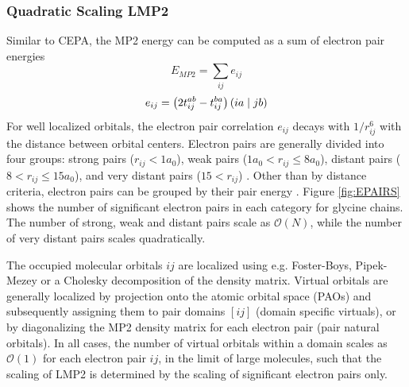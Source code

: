 \subsubsection{Quadratic Scaling LMP2}

Similar to CEPA, the MP2 energy can be computed as a sum of electron pair energies
\begin{equation}
E_{MP2} = \sum_{ij} e_{ij}
\end{equation}
\begin{equation}
e_{ij} = \left( 2t_{ij}^{ab} - t_{ij}^{ba} \right) \left( ia \mid jb \right) 
\end{equation} 
 \noindent For well localized orbitals, the electron pair correlation $e_{ij}$ decays with $1/r_{ij}^6$ with the distance between orbital centers. Electron pairs are generally divided into four groups: strong pairs ($r_{ij} < 1a_0$), weak pairs ($1a_0 < r_{ij} \leq 8 a_0$), distant pairs ($8 < r_{ij} \leq 15 a_0$), and very distant pairs ($15 < r_{ij}$) \cite{Sch1999}. Other than by distance criteria, electron pairs can be grouped by their pair energy \cite{Nee2009}. Figure \ref{fig:EPAIRS} shows the number of significant electron pairs in each category for glycine chains. The number of strong, weak and distant pairs scale as $\mathcal{O}(N)$, while the number of very distant pairs scales quadratically. 

The occupied molecular orbitals $ij$ are localized using e.g. Foster-Boys, Pipek-Mezey or a Cholesky decomposition of the density matrix. Virtual orbitals are generally localized by projection onto the atomic orbital space (PAOs) and subsequently assigning them to pair domains $[ij]$ (domain specific virtuals), or by diagonalizing the MP2 density matrix for each electron pair (pair natural orbitals).  In all cases, the number of virtual orbitals within a domain scales as $\mathcal{O}(1)$ for each electron pair $ij$, in the limit of large molecules, such that the scaling of LMP2 is determined by the scaling of significant electron pairs only.

